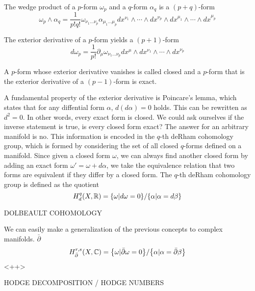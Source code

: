 The wedge product of a $p$-form $\omega_p$ and a $q$-form $\alpha_q$ is a $(p+q)$-form
\begin{equation}
  \omega_p \wedge \alpha_q  = \frac{1}{p!q!}\omega_{\nu_1\ldots\nu_p}
\alpha_{\mu_1\ldots\mu_p}dx^{\nu_1}\wedge \cdots  \wedge dx^{\nu_p}\wedge dx^{\mu_1}\wedge \cdots  \wedge dx^{\mu_p} 
\end{equation}

The exterior derivative of a $p$-form yields a $(p+1)$-form
\begin{equation}
  d\omega_p = \frac{1}{p!}\partial_\mu \omega_{\nu_1\ldots\nu_p}dx^\mu\wedge dx^{\nu_1}\wedge\cdots\wedge dx^{\nu_p}
\end{equation}

A $p$-form whose exterior derivative vanishes is called closed and a $p$-form that is the exterior derivative
of a $(p-1)$-form is exact.

A fundamental property of the exterior derivative is Poincare's lemma, which states that for any diffential form $\alpha$, $d(d\alpha)=0$ holds.
This can be rewritten as $d^2=0$. In other words, every exact form is closed.
We could ask ourselves if the inverse statement is true, 
is every closed form exact?
The answer for an arbitrary manifold is no.%
This information is encoded in the $q$-th deRham cohomology group, which is formed by considering
the set of all closed $q$-forms defined on a manifold.
Since given a closed form $\omega$, we can always find another closed form by adding an exact form
$\omega' = \omega+d\alpha$, we take the equivalence relation that two forms are equivalent if
they differ by a closed form.
The $q$-th deRham cohomology group is defined as the quotient
\begin{equation}
  H^q_d(X,\mathbb R)=\qty{\omega| d\omega=0}/\qty{\alpha|\alpha=d\beta}
\end{equation}

DOLBEAULT COHOMOLOGY

We can easily make a generalization of the previous concepts to complex manifolds.
$\bar\partial$
\begin{equation}
  H^{r,s}_{\bar \partial }(X,\mathbb C)=\qty {\omega | \bar \partial \omega= 0}/\qty{\alpha|\alpha=\bar\partial \beta}
\end{equation}<++>

HODGE DECOMPOSITION / HODGE NUMBERS


